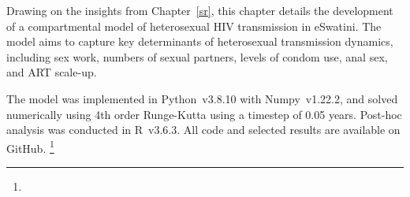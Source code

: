 Drawing on the insights from Chapter~\ref{sr},
this chapter details the development of
a compartmental model of heterosexual HIV transmission in eSwatini.
The model aims to capture key determinants of heterosexual transmission dynamics, including
sex work, numbers of sexual partners, levels of condom use, anal sex, and ART scale-up.
\par
The model was implemented in Python~v3.8.10 with Numpy~v1.22.2,
and solved numerically using 4th order Runge-Kutta \cite{Gill1951} using a timestep of 0.05 years.
Post-hoc analysis was conducted in R~v3.6.3.
All code and selected results are available on GitHub.%
\footnote{}